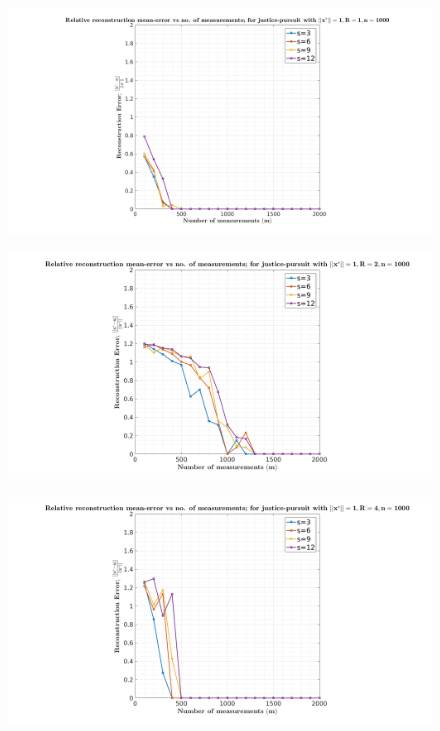 \begin{figure}[t]
	\begin{center}
		\includegraphics[width=\linewidth]{./fig/rcm_jp_r_1_s.png}
	\end{center}
	\caption{}
	\label{fig:plot-2-1}
\end{figure}


\begin{figure}[t]
	\begin{center}
		\includegraphics[width=\linewidth]{./fig/rcm_jp_r_2_s.png}
	\end{center}
	\caption{}
	\label{fig:plot-2-2}
\end{figure}


\begin{figure}[t]
	\begin{center}
		\includegraphics[width=\linewidth]{./fig/rcm_jp_r_4_s.png}
	\end{center}
	\caption{}
	\label{fig:plot-2-3}
\end{figure}